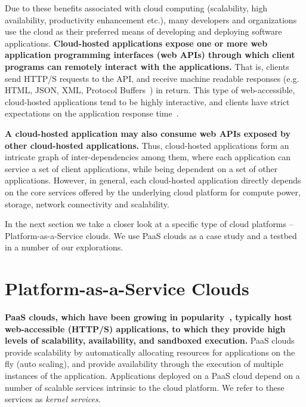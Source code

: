 Due to these benefits associated with cloud computing (scalability, high availability, productivity enhancement etc.),
many developers and organizations use the cloud as their preferred means of developing and deploying
software applications. \textbf{Cloud-hosted applications expose one or more web application programming 
interfaces (web APIs) through which client programs can remotely interact with the applications.} That is, clients
send HTTP/S requests to the API, and receive machine readable responses (e.g. HTML, JSON,
XML, Protocol Buffers~\cite{protobuff}) in return. This type of web-accessible, cloud-hosted applications
tend to be highly interactive, and clients have strict expectations on the application
response time~\cite{latency-matters}.

\textbf{A cloud-hosted application may
also consume web APIs exposed by other cloud-hosted applications.} Thus, cloud-hosted applications
form an intricate graph of inter-dependencies among them, where each application can service a set of client
applications, while being dependent on a set of other applications. However, in general, each cloud-hosted
application directly depends on the core services offered by the underlying cloud platform for compute power, storage,
network connectivity and scalability.

In the next section we take a closer look at a specific type of cloud platforms -- Platform-as-a-Service clouds.
We use PaaS clouds as a case study and a testbed in a number of our explorations.

\section{Platform-as-a-Service Clouds}

\textbf{PaaS clouds, which have been growing in popularity~\cite{paas-growth,paas-growth2}, 
typically host web-accessible (HTTP/S) applications, to which they provide
high levels of scalability, availability, and sandboxed execution.} PaaS clouds
provide scalability by automatically allocating resources for
applications on the fly (auto scaling), and provide availability through the
execution of multiple instances of the application. Applications deployed on
a PaaS cloud depend on a number of scalable services intrinsic to the 
cloud platform. We refer to these services as \textit{kernel services}.

